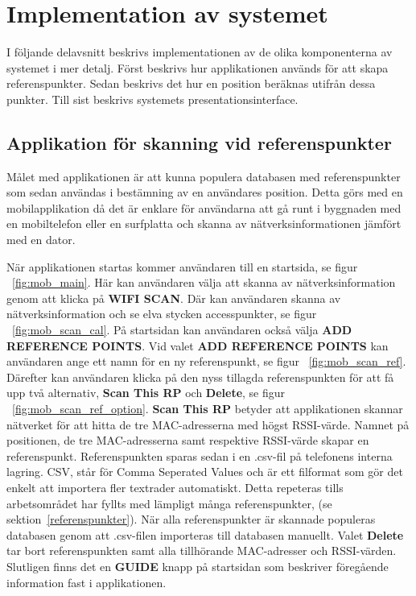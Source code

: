 \documentclass[a4paper,12pt]{article}
\begin{document}
 \section{Implementation av systemet}
 I följande delavsnitt beskrivs implementationen av de olika komponenterna av systemet i mer detalj. Först beskrivs hur applikationen används för att skapa referenspunkter. Sedan beskrivs det hur en position beräknas utifrån dessa punkter. Till sist beskrivs systemets presentationsinterface.

 \subsection{Applikation för skanning vid referenspunkter}
 Målet med applikationen är att kunna populera databasen med referenspunkter som sedan användas i bestämning av en användares position. Detta görs med en mobilapplikation då det är enklare för användarna att gå runt i byggnaden med en mobiltelefon eller en surfplatta och skanna av nätverksinformationen jämfört med en dator.

 När applikationen startas kommer användaren till en startsida, se figur ~\ref{fig:mob_main}. Här kan användaren välja att skanna av nätverksinformation genom att klicka på \textbf{WIFI SCAN}. Där kan användaren skanna av nätverksinformation och se elva stycken accesspunkter, se figur ~\ref{fig:mob_scan_cal}. På startsidan kan användaren också välja \textbf{ADD REFERENCE POINTS}. Vid valet \textbf{ADD REFERENCE POINTS} kan användaren ange ett namn för en ny referenspunkt, se figur ~\ref{fig:mob_scan_ref}. Därefter kan användaren klicka på den nyss tillagda referenspunkten för att få upp två alternativ, \textbf{Scan This RP} och \textbf{Delete}, se figur ~\ref{fig:mob_scan_ref_option}. \textbf{Scan This RP} betyder att applikationen skannar nätverket för att hitta de tre MAC-adresserna med högst RSSI-värde. Namnet på positionen, de tre MAC-adresserna samt respektive RSSI-värde skapar en referenspunkt. Referenspunkten sparas sedan i en .csv-fil på telefonens interna lagring.
 CSV, står för Comma Seperated Values och är ett filformat som gör det enkelt att importera fler textrader automatiskt. Detta repeteras tills arbetsområdet har fyllts med lämpligt många referenspunkter, (se sektion~\ref{referenspunkter}). När alla referenspunkter är skannade populeras databasen genom att .csv-filen importeras till databasen manuellt. Valet \textbf{Delete} tar bort referenspunkten samt alla tillhörande MAC-adresser och RSSI-värden. Slutligen finns det en \textbf{GUIDE} knapp på startsidan som beskriver föregående information fast i applikationen.
\end{document}
